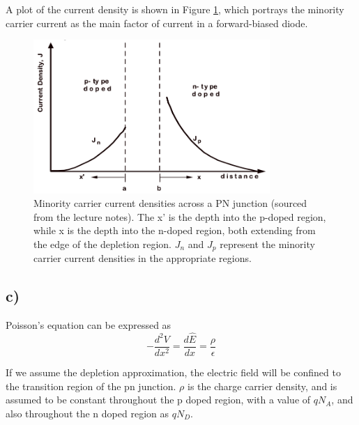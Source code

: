 	A plot of the current density is shown in Figure \ref{fig::current}, which portrays the minority carrier current as the main factor of current in a forward-biased diode.
	
	\begin{figure}
		\centering
		\includegraphics[width=0.8\textwidth]{./img/2b_current}
		\caption{Minority carrier current densities across a PN junction (sourced from the lecture notes). The x' is the depth into the p-doped region, while x is the depth into the n-doped region, both extending from the edge of the depletion region. $J_n$ and $J_p$ represent the minority carrier current densities in the appropriate regions.}
		\label{fig::current}
	\end{figure}
\subsection*{c)}
	Poisson's equation can be expressed as
	$$-\dfrac{d^2 V}{d x^2} = \dfrac{d\hat{E}}{dx} = \frac{\rho}{\epsilon} %
	$$
	
	If we assume the depletion approximation, the electric field will be confined to the transition region of the pn junction. $\rho$ is the charge carrier density, and is assumed to be constant throughout the p doped region, with a value of $q N_A$, and also throughout the n doped region as $q N_D$.
	
